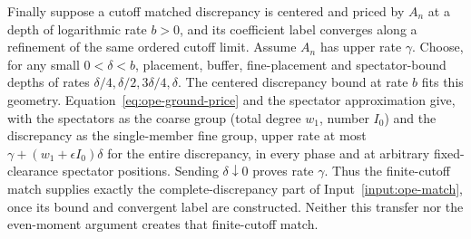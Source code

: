 Finally suppose a cutoff matched discrepancy is centered and priced by
$A_n$ at a depth of logarithmic rate $b>0$, and its coefficient label
converges along a refinement of the same ordered cutoff limit. Assume
$A_n$ has upper rate $\gamma$. Choose, for any small $0<\delta<b$,
placement, buffer, fine-placement and spectator-bound depths of rates
$\delta/4,\delta/2,3\delta/4,\delta$. The centered discrepancy bound
at rate $b$ fits this geometry. Equation~\eqref{eq:ope-ground-price}
and the spectator approximation give, with the spectators as the coarse
group (total degree $w_1$, number $I_0$) and the discrepancy as the
single-member fine group, upper rate at most
$\gamma+(w_1+\epsilon I_0)\delta$ for the entire discrepancy, in every
phase and at arbitrary fixed-clearance spectator positions. Sending
$\delta\downarrow0$ proves rate $\gamma$. Thus the finite-cutoff match
supplies exactly the complete-discrepancy part of
Input~\ref{input:ope-match}, once its bound and convergent label are
constructed. Neither this transfer nor the even-moment argument creates
that finite-cutoff match.
